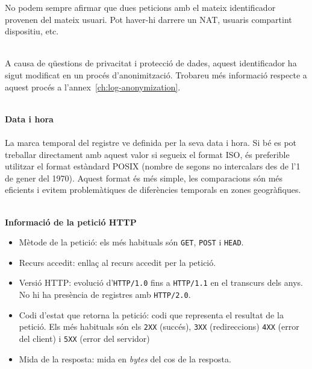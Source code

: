 \begin{tcolorbox}[colback=green!5!white, colframe=green!50!black, title=Els usuaris poden estar darrere d'un NAT]\label{tcbox:iguals-emmascarats}
    No podem sempre afirmar que dues peticions amb el mateix identificador provenen del mateix usuari.
    Pot haver-hi darrere un \gls{NAT}, usuaris compartint dispositiu, etc.
\end{tcolorbox}

\noindent \\
A causa de qüestions de privacitat i protecció de dades, aquest identificador ha sigut modificat en un procés d'anonimització.
Trobareu més informació respecte a aquest procés a l'annex~\ref{ch:log-anonymization}. \\

\clearpage

\noindent \\
\textbf{Data i hora} \\ \\
La marca temporal del registre ve definida per la seva data i hora.
Si bé es pot treballar directament amb aquest valor si segueix el format \gls{ISO}, és preferible utilitzar el format estàndard \gls{POSIX} (nombre de segons no intercalars des de l'1 de gener del 1970).
Aquest format és més simple, les comparacions són més eficients i evitem problemàtiques de diferències temporals en zones geogràfiques.

\noindent \\
\textbf{Informació de la petició \gls{HTTP}}~\cite{http}

\begin{itemize}
    \item Mètode de la petició: els més habituals són \texttt{GET}, \texttt{POST} i \texttt{HEAD}.
    \item Recurs accedit: enllaç al recurs accedit per la petició.
    \item Versió \gls{HTTP}: evolució d'\texttt{HTTP/1.0} fins a \texttt{HTTP/1.1} en el transcurs dels anys.
    No hi ha presència de registres amb \texttt{HTTP/2.0}.
    \item Codi d'estat que retorna la petició: codi que representa el resultat de la petició.
    Els més habituals són els \texttt{2XX} (succés), \texttt{3XX} (redireccions) \texttt{4XX} (error del client) i \texttt{5XX} (error del servidor)
    \item Mida de la resposta: mida en \textit{bytes} del cos de la resposta.
\end{itemize}


